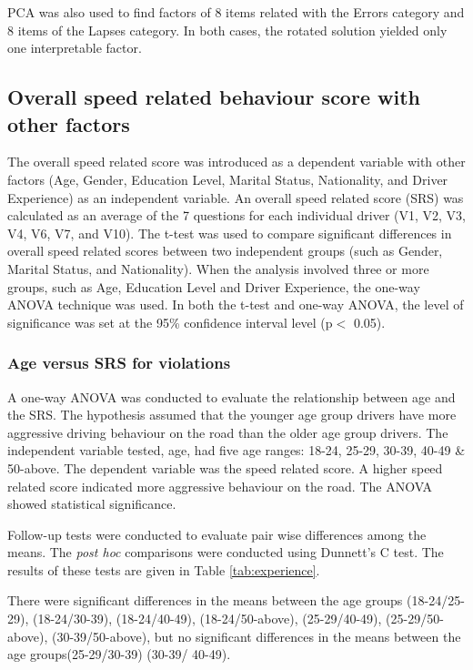 \documentclass[preprint,12pt,a4paper,authoryear]{elsarticle}
\begin{document}
PCA was also used to find factors of 8 items related with the Errors category and 8 items of the Lapses category. In both cases, the rotated solution yielded only one interpretable factor.

\subsection{Overall speed related behaviour score with other factors}

The overall speed related score was introduced as a dependent variable with other factors (Age, Gender, Education Level, Marital Status, Nationality, and Driver Experience) as an independent variable. An overall speed related score (SRS) was calculated as an average of the 7 questions for each individual driver (V1, V2, V3, V4, V6, V7, and V10). The t-test was used to compare significant differences in overall speed related scores between two independent groups (such as Gender, Marital Status, and Nationality). When the analysis involved three or more groups, such as Age, Education Level and Driver Experience, the one-way ANOVA technique was used. In both the t-test and one-way ANOVA, the level of significance was set at the 95\% confidence interval level (p$<$ 0.05). 

\subsubsection{Age versus SRS for violations }

A one-way ANOVA was conducted to evaluate the relationship between age and the SRS. The hypothesis assumed that the younger age group drivers have more aggressive driving behaviour on the road than the older age group drivers. The independent variable tested, age, had five age ranges: 18-24, 25-29, 30-39, 40-49 \& 50-above. The dependent variable was the speed related score. A higher speed related score indicated more aggressive behaviour on the road. The ANOVA showed statistical significance.

Follow-up tests were conducted to evaluate pair wise differences among the means. The \textit{post hoc} comparisons were conducted using Dunnett's C test. The results of these tests are given in Table \ref{tab:experience}. 

There were significant differences in the means between the age groups (18-24/25-29), (18-24/30-39), (18-24/40-49), (18-24/50-above), (25-29/40-49), (25-29/50-above), (30-39/50-above),  but no significant differences in the means between the age groups(25-29/30-39) (30-39/ 40-49). 
\end{document}
